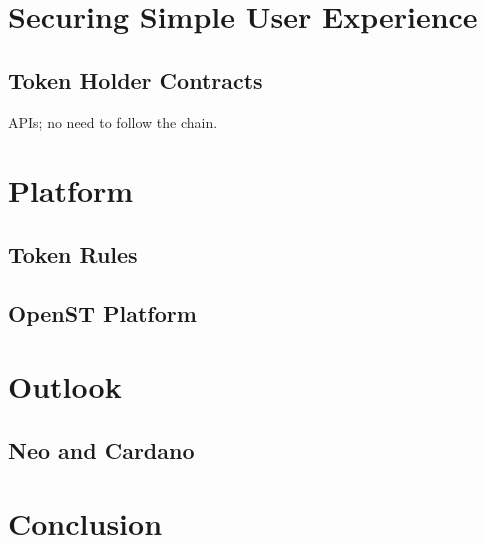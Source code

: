 \documentclass[12pt,a4paper,draft]{article}
\begin{document}
%
%
\section{Securing Simple User Experience}

\subsection{Token Holder Contracts}

APIs; no need to follow the chain.

%
%
\section{Platform}

\subsection{Token Rules}

\subsection{OpenST Platform}

%
%
\section{Outlook}

\subsection{Neo and Cardano}

%
%
\section{Conclusion}



\end{document}
